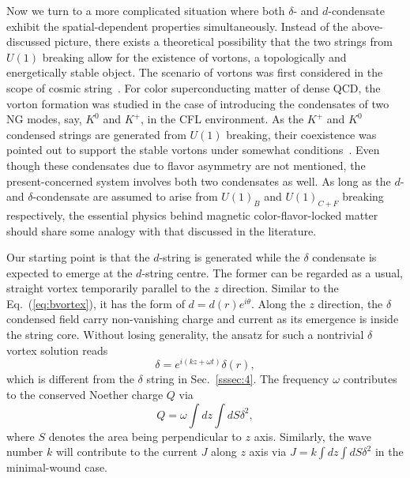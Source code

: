 Now we turn to a more complicated situation where both $\delta$- and $d$-condensate exhibit the
spatial-dependent properties simultaneously. Instead of the above-discussed picture, there exists a
theoretical possibility that the two strings from $U(1)$ breaking allow for the existence of vortons,
a topologically and energetically stable object. The scenario of vortons was first considered in the
scope of cosmic
string~\cite{vilenkin2000cosmic,witten1985superconducting,davis1988physics1,davis1988physics2,haws1988superconducting}.
For color superconducting matter of dense QCD, the vorton formation was studied in the case of introducing the
condensates of two NG modes, say, $K^0$ and $K^+$, in the CFL environment. As the $K^+$ and $K^0$ condensed strings are generated from $U(1)$ breaking, their coexistence was pointed out to support the stable vortons under somewhat conditions~\cite{kaplan2002charged,buckley2002superconducting}. 
Even though these condensates due to flavor asymmetry are not mentioned, the present-concerned system involves both two condensates as well. As long as the $d$- and
$\delta$-condensate are assumed to arise from $U(1)_B$ and $U(1)_{C+F}$ breaking respectively, the essential physics
behind magnetic color-flavor-locked matter should share some analogy with that discussed in the literature.
%

Our starting point is that the $d$-string is generated while the $\delta$ condensate is expected to emerge
at the $d$-string centre. The former can be regarded as a usual, straight vortex temporarily parallel to the
$z$ direction. Similar to the Eq.~(\ref{eq:bvortex}), it has the form of $d = d(r)e^{i\theta}$.
Along the $z$ direction, the $\delta$ condensed field carry non-vanishing charge and current as its emergence
is inside the string core. Without losing generality, the ansatz for such a nontrivial $\delta$ vortex solution reads
\begin{equation}
  \label{eq:delta}
  \delta =  e^{i(kz+\omega t)}\delta(r),
\end{equation}
which is different from the $\delta$ string in Sec.~\ref{sssec:4}. The frequency $\omega$ contributes to the conserved
Noether charge $Q$ via
 \begin{equation}
  \label{eq:vortonquantumq}
   Q = \omega\int dz \int dS \delta^2,
 \end{equation}
where $S$ denotes the area being perpendicular to $z$ axis. Similarly, the wave number $k$ will contribute to the
current $J$ along $z$ axis via $J =k\int dz \int dS \delta^2$ in the minimal-wound case.

